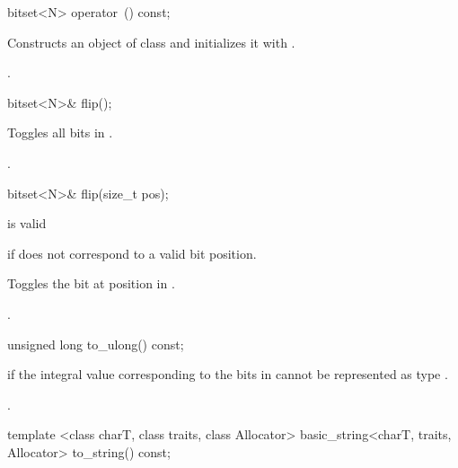 %
\begin{itemdecl}
bitset<N> operator~() const;
\end{itemdecl}

\begin{itemdescr}
\pnum
\effects
Constructs an object  of class
and initializes it with
.

\pnum
\returns
{}.
\end{itemdescr}

%
\begin{itemdecl}
bitset<N>& flip();
\end{itemdecl}

\begin{itemdescr}
\pnum
\effects
Toggles all bits in
.

\pnum
\returns
{}.
\end{itemdescr}

\begin{itemdecl}
bitset<N>& flip(size_t pos);
\end{itemdecl}

\begin{itemdescr}
\pnum
\requires
{} is valid

\pnum
\throws
{}
if  does not correspond to a valid bit position.%

\pnum
\effects
Toggles the bit at position  in
.

\pnum
\returns
{}.
\end{itemdescr}

%
\begin{itemdecl}
unsigned long to_ulong() const;
\end{itemdecl}

\begin{itemdescr}
\pnum
\throws
{}%
if the integral value  corresponding to the bits in
cannot be represented as type
.

\pnum
\returns
{}.
\end{itemdescr}

%
\begin{itemdecl}
template <class charT, class traits, class Allocator>
basic_string<charT, traits, Allocator> to_string() const;
\end{itemdecl}

